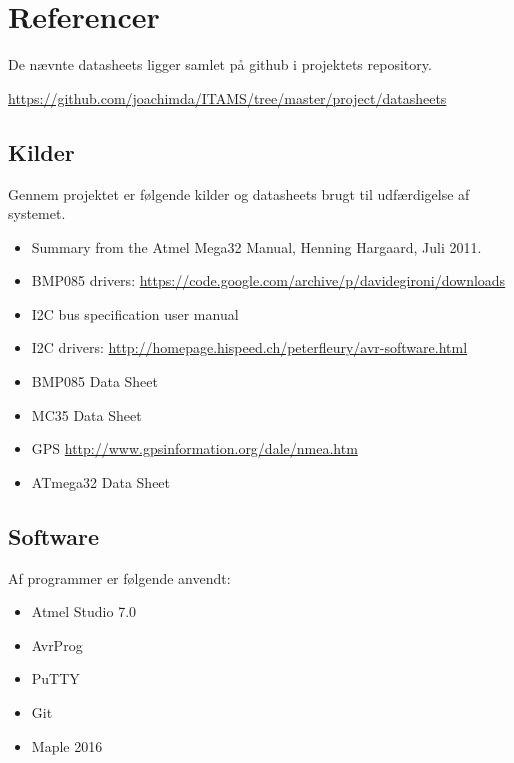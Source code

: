 \section{Referencer}\label{sec:refs}

De nævnte datasheets ligger samlet på github i projektets repository.

\begin{center}
	\url{https://github.com/joachimda/ITAMS/tree/master/project/datasheets}
\end{center}

\subsection{Kilder}

Gennem projektet er følgende kilder og datasheets brugt til udfærdigelse af systemet. 

\begin{itemize}
	\item Summary from the Atmel Mega32 Manual, Henning Hargaard, Juli 2011.
	\item BMP085 drivers: \url{https://code.google.com/archive/p/davidegironi/downloads}
	\item I2C bus specification user manual
	\item I2C drivers: \url{http://homepage.hispeed.ch/peterfleury/avr-software.html}
	\item BMP085 Data Sheet
	\item MC35 Data Sheet
	\item GPS \url{http://www.gpsinformation.org/dale/nmea.htm}
	\item ATmega32 Data Sheet
\end{itemize}

\subsection{Software}

Af programmer er følgende anvendt:

\begin{itemize}
	\item Atmel Studio 7.0
	\item AvrProg
	\item PuTTY
	\item Git
	\item Maple 2016
\end{itemize}